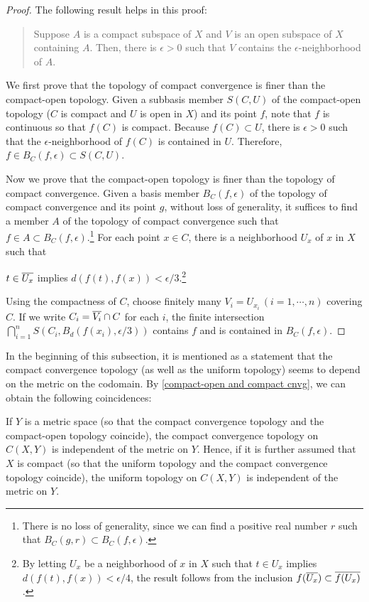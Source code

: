 \begin{proof}
    The following result helps in this proof:
    \begin{quotation}
        Suppose $A$ is a compact subspace of $X$ and $V$ is an open subspace of $X$ containing $A$.
        Then, there is $\epsilon>0$ such that $V$ contains the $\epsilon$-neighborhood of $A$.
    \end{quotation}

    We first prove that the topology of compact convergence is finer than the compact-open topology.
    Given a subbasis member $S(C, U)$ of the compact-open topology ($C$ is compact and $U$ is open in $X$) and its point $f$, note that $f$ is continuous so that $f(C)$ is compact.
    Because $f(C)\subset U$, there is $\epsilon>0$ such that the $\epsilon$-neighborhood of $f(C)$ is contained in $U$.
    Therefore, $f\in B_C(f, \epsilon)\subset S(C, U)$.

    Now we prove that the compact-open topology is finer than the topology of compact convergence.
    Given a basis member $B_C(f, \epsilon)$ of the topology of compact convergence and its point $g$, without loss of generality, it suffices to find a member $A$ of the topology of compact convergence such that $f\in A\subset B_C(f, \epsilon)$.\footnote{There is no loss of generality, since we can find a positive real number $r$ such that $B_C(g, r)\subset B_C(f, \epsilon)$.}
    For each point $x\in C$, there is a neighborhood $U_x$ of $x$ in $X$ such that
    \begin{center}
        $t\in\overline{U_x}$ implies $d(f(t), f(x))<\epsilon/3$.\footnote{By letting $U_x$ be a neighborhood of $x$ in $X$ such that $t\in U_x$ implies $d(f(t), f(x))<\epsilon/4$, the result follows from the inclusion $f(\overline{U_x})\subset\overline{f(U_x)}$.}
    \end{center}
    Using the compactness of $C$, choose finitely many $V_i=U_{x_i}\,(i=1, \cdots, n)$ covering $C$.
    If we write $C_i=\overline{V_i}\cap C$ for each $i$, the finite intersection $\bigcap_{i=1}^n S(C_i, B_d(f(x_i), \epsilon/3))$ contains $f$ and is contained in $B_C(f, \epsilon)$.
\end{proof}
In the beginning of this subsection, it is mentioned as a statement that the compact convergence topology (as well as the uniform topology) seems to depend on the metric on the codomain.
By \cref{compact-open and compact cnvg}, we can obtain the following coincidences:
\begin{cor}\label{compact convergence topology is independent}
    If $Y$ is a metric space (so that the compact convergence topology and the compact-open topology coincide), the compact convergence topology on $C(X, Y)$ is independent of the metric on $Y$.
    Hence, if it is further assumed that $X$ is compact (so that the uniform topology and the compact convergence topology coincide), the uniform topology on $C(X, Y)$ is independent of the metric on $Y$.
\end{cor}

